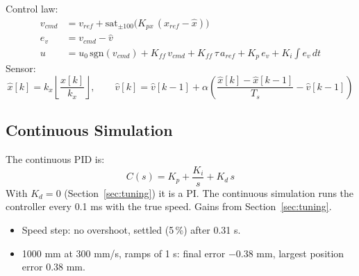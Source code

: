 \documentclass[11pt,a4paper]{article}
\begin{document}
Control law:
\begin{align}
  v_{cmd} &= v_{ref} + \mathrm{sat}_{\pm 100}\bigl(K_{px}\,(x_{ref} - \hat{x})\bigr) \\
  e_v     &= v_{cmd} - \hat{v} \\
  u       &= u_0\,\mathrm{sgn}(v_{cmd}) + K_{ff}\,v_{cmd} + K_{ff}\,\tau\,a_{ref}
             + K_p\,e_v + K_i \int e_v\,dt
\end{align}
Sensor:
\begin{equation}
  \hat{x}[k] = k_x \left\lfloor \frac{x[k]}{k_x} \right\rfloor,
  \qquad
  \hat{v}[k] = \hat{v}[k-1] + \alpha \left( \frac{\hat{x}[k] - \hat{x}[k-1]}{T_s} - \hat{v}[k-1] \right)
\end{equation}

\subsection{Continuous Simulation}
The continuous PID is:
\begin{equation}
  C(s) = K_p + \frac{K_i}{s} + K_d\,s
\end{equation}
With \(K_d = 0\) (Section~\ref{sec:tuning}) it is a PI.
The continuous simulation runs the controller every 0.1 ms with the true speed.
Gains from Section~\ref{sec:tuning}.
\begin{itemize}
  \item Speed step: no overshoot, settled (5\,\%) after 0.31 s.
  \item 1000 mm at 300 mm/s, ramps of 1 s: final error \(-0.38\) mm, largest position error 0.38 mm.
\end{itemize}
\end{document}
